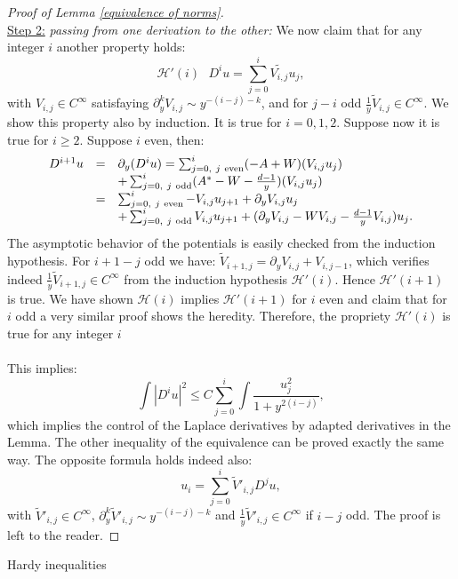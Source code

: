 \documentclass[11pt,a4paper,reqno]{amsart}
\theoremstyle{remark}
\numberwithin{equation}{section}
\begin{document}
\begin{appendix}
\begin{proof}[Proof of Lemma \ref{equivalence of norms}]
\\
\underline{Step 2:} \emph{passing from one derivation to the other:} We now claim that for any integer $i$ another property holds:
$$
\mathcal{H}'(i) \ \ \ D^iu=\sum_{j=0}^i \tilde{V_{i,j}} u_j ,
$$
with $V_{i,j}\in C^{\infty}$ satisfaying $\partial_y^k V_{i,j}\sim y^{-(i-j)-k}$, and for $j-i$ odd $\frac{1}{y}\tilde{V}_{i,j}\in C^{\infty}$. We show this property also by induction. It is true for $i=0,1,2$. Suppose now it is true for $i\geq 2$. Suppose $i$ even, then:
$$
\begin{array}{r c l}
D^{i+1}u&=&\partial_y(D^iu)=\sum_{j=0, \ j \ \text{even}}^i(-A+W)(V_{i,j}u_j) \\
&& + \sum_{j=0, \ j \ \text{odd}}^i (A^*-W-\frac{d-1}{y})(V_{i,j}u_j) \\
&=& \sum_{j=0, \ j \ \text{even}}^i -V_{i,j}u_{j+1}+\partial_y V_{i,j}u_j \\
&& + \sum_{j=0, \ j \ \text{odd}}^i V_{i,j}u_{j+1}+(\partial_y V_{i,j}-WV_{i,j}-\frac{d-1}{y}V_{i,j})u_j .
\end{array}
$$
The asymptotic behavior of the potentials is easily checked from the induction hypothesis. For $i+1-j$ odd we have: $\tilde{V}_{i+1,j}=\partial_y V_{i,j}+V_{i,j-1}$, which verifies indeed $\frac{1}{y}\tilde{V}_{i+1,j}\in C^{\infty}$ from the induction hypothesis $\mathcal{H}'(i)$. Hence $\mathcal{H}'(i+1)$ is true. We have shown $\mathcal{H}(i)$ implies $\mathcal{H}'(i+1)$ for $i$ even and claim that for $i$ odd a very similar proof shows the heredity. Therefore, the propriety $\mathcal{H}'(i)$ is true for any integer $i$\\
\\
This implies:
$$
\int |D^i u|^2 \leq C \sum_{j=0}^i \int \frac{u_j^2}{1+y^{2(i-j)}} ,
$$
which implies the control of the Laplace derivatives by adapted derivatives in the Lemma. The other inequality of the equivalence can be proved exactly the same way. The opposite formula holds indeed also:
$$
u_i=\sum_{j=0}^i \tilde{V}'_{i,j} D^{j}u ,
$$
with $\tilde{V}'_{i,j}\in C^{\infty}$, $\partial_y^k \tilde{V}'_{i,j}\sim y^{-(i-j)-k}$ and $\frac{1}{y}\tilde{V}'_{i,j}\in C^{\infty}$ if $i-j$ odd. The proof is left to the reader.

\end{proof}

{  \z@{1.5\linespacing\@plus\linespacing}{.5\linespacing}  {\normalfont\bfseries\large\centering}}{Hardy inequalities}


\end{appendix}
\end{document}
